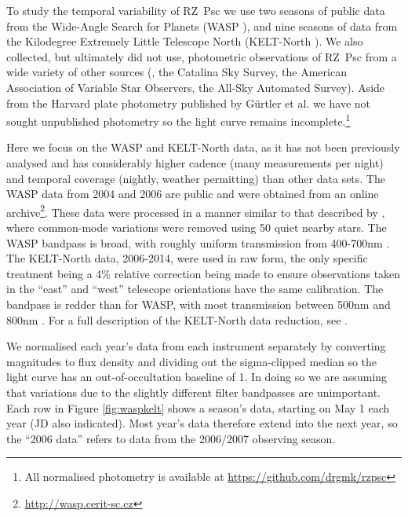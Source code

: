 \documentclass[]{rsos}
\begin{document}
To study the temporal variability of RZ~Psc we use two seasons of public data from the
Wide-Angle Search for Planets (WASP \cite{2006PASP..118.1407P,2010A&A...520L..10B}), and
nine seasons of data from the Kilodegree Extremely Little Telescope North (KELT-North
\cite{2007PASP..119..923P}). We also collected, but ultimately did not use, photometric
observations of RZ~Psc from a wide variety of other sources
(\cite{1994AJ....108.1906H,1973IBVS..783....1K,1980PZ.....21..310K,1985PZ.....22..181Z,1991Afz....34..333K,1997AcA....47..467P,2014Ap.....57..491P},
the Catalina Sky Survey, the American Association of Variable Star Observers, the All-Sky
Automated Survey). Aside from the Harvard plate photometry published by G\"urtler et
al. \cite{1999A&AS..140..293G} we have not sought unpublished photometry so the light
curve remains incomplete.\footnote{All normalised photometry is available at
  \href{https://github.com/drgmk/rzpsc}{https://github.com/drgmk/rzpsc}}

Here we focus on the WASP and KELT-North data, as it has not been previously analysed and
has considerably higher cadence (many measurements per night) and temporal coverage
(nightly, weather permitting) than other data sets. The WASP data from 2004 and 2006 are
public and were obtained from an online
archive\footnote{\href{http://wasp.cerit-sc.cz}{http://wasp.cerit-sc.cz}}. These data
were processed in a manner similar to that described by \cite{2014MNRAS.441.2845V}, where
common-mode variations were removed using 50 quiet nearby stars. The WASP bandpass is
broad, with roughly uniform transmission from 400-700nm \cite{2006PASP..118.1407P}. The
KELT-North data, 2006-2014, were used in raw form, the only specific treatment being a
4\% relative correction being made to ensure observations taken in the ``east'' and
``west'' telescope orientations have the same calibration. The bandpass is redder than
for WASP, with most transmission between 500nm and 800nm \cite{2007PASP..119..923P}.  For
a full description of the KELT-North data reduction, see \cite{2012ApJ...761..123S}.

We normalised each year's data from each instrument separately by converting magnitudes
to flux density and dividing out the sigma-clipped median so the light curve has an
out-of-occultation baseline of 1. In doing so we are assuming that variations due to the
slightly different filter bandpasses are unimportant. Each row in Figure
\ref{fig:waspkelt} shows a season's data, starting on May 1 each year (JD also
indicated). Most year's data therefore extend into the next year, so the ``2006 data''
refers to data from the 2006/2007 observing season.
\end{document}
